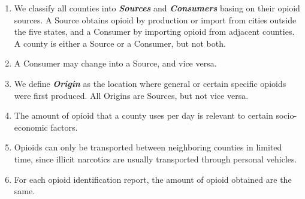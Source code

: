 \begin{enumerate}[$\mathcal{A}$1.]
	\item We classify all counties into \textbf{\itshape Sources} and \textbf{\itshape Consumers} basing on their opioid sources. A Source obtains opioid by production or import from cities outside the five states, and a Consumer by importing opioid from adjacent counties. A county is either a Source or a Consumer, but not both.
	
	\item A Consumer may change into a Source, and vice versa.
	
	\item We define \textbf{\itshape Origin} as the location where general or certain specific opioids were first produced. All Origins are Sources, but not vice versa.
	
	\item The amount of opioid that a county uses per day is relevant to certain socio-economic factors.
	
	\item Opioids can only be transported between neighboring counties in limited time, since illicit narcotics are usually transported through personal vehicles.\cite{9}
	
	\item For each opioid identification report, the amount of opioid obtained are the same. 
\end{enumerate}